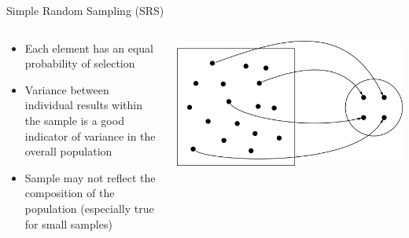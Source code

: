 \begin{frame}{Simple Random Sampling (SRS)}

\begin{columns}
    \begin{column}{0.5\textwidth}
        \begin{itemize}
            \item Each element has an equal probability of selection
            \item Variance between individual results within the sample is a good indicator of variance in the overall population
            \item Sample may not reflect the composition of the population (especially true for small samples)
        \end{itemize}
    \end{column}
    \begin{column}{0.5\textwidth}
        \includegraphics[width=\textwidth]{gfx/random_sampling}
    \end{column}
\end{columns}

\end{frame}

